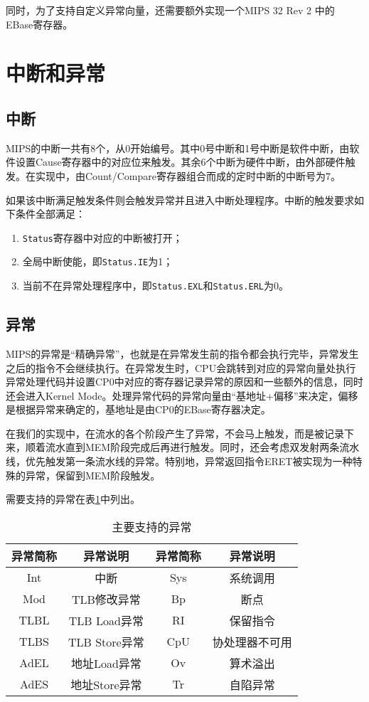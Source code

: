 同时，为了支持自定义异常向量，还需要额外实现一个MIPS 32 Rev 2 中的 EBase寄存器。

\section{中断和异常}
\subsection{中断}
MIPS的中断一共有8个，从0开始编号。其中0号中断和1号中断是软件中断，由软件设置Cause寄存器中的对应位来触发。其余6个中断为硬件中断，由外部硬件触发。在实现中，由Count/Compare寄存器组合而成的定时中断的中断号为7。

如果该中断满足触发条件则会触发异常并且进入中断处理程序。中断的触发要求如下条件全部满足：
\begin{enumerate}
	\item \texttt{Status}寄存器中对应的中断被打开；
	\item 全局中断使能，即\texttt{Status.IE}为1；
	\item 当前不在异常处理程序中，即\texttt{Status.EXL}和\texttt{Status.ERL}为0。
\end{enumerate}

\subsection{异常}
MIPS的异常是“精确异常”，也就是在异常发生前的指令都会执行完毕，异常发生之后的指令不会继续执行。在异常发生时，CPU会跳转到对应的异常向量处执行异常处理代码并设置CP0中对应的寄存器记录异常的原因和一些额外的信息，同时还会进入Kernel Mode。处理异常代码的异常向量由“基地址+偏移”来决定，偏移是根据异常来确定的，基地址是由CP0的EBase寄存器决定。

在我们的实现中，在流水的各个阶段产生了异常，不会马上触发，而是被记录下来，顺着流水直到MEM阶段完成后再进行触发。同时，还会考虑双发射两条流水线，优先触发第一条流水线的异常。特别地，异常返回指令ERET被实现为一种特殊的异常，保留到MEM阶段触发。

需要支持的异常在表\ref{table:main-exception}中列出。

\begin{table}[htbp]
	\centering
	\caption{主要支持的异常}
	\label{table:main-exception}
	\begin{tabular}{|c|c|c|c|} \hline
		\textbf{异常简称} & \textbf{异常说明} & 	\textbf{异常简称} & \textbf{异常说明} \\ \hline
		Int & 中断   & Sys & 系统调用             \\ \hline
		Mod & TLB修改异常 & 	Bp & 断点  \\ \hline
		TLBL & TLB Load异常 & 	RI & 保留指令 \\ \hline
		TLBS & TLB Store异常 & 	CpU & 协处理器不可用 \\ \hline
		AdEL & 地址Load异常 & Ov & 算术溢出\\ \hline
		AdES & 地址Store异常 & 	Tr & 自陷异常 \\ \hline
	\end{tabular}
\end{table}
